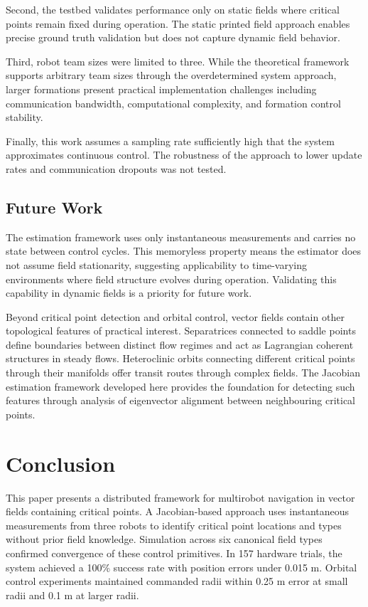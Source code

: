 \documentclass[lettersize,journal]{IEEEtran}
\begin{document}
Second, the testbed validates performance only on static fields where critical points remain fixed during operation. The static printed field approach enables precise ground truth validation but does not capture dynamic field behavior.

Third, robot team sizes were limited to three. While the theoretical framework supports arbitrary team sizes through the overdetermined system approach, larger formations present practical implementation challenges including communication bandwidth, computational complexity, and formation control stability.

Finally, this work assumes a sampling rate sufficiently high that the system approximates continuous control. The robustness of the approach to lower update rates and communication dropouts was not tested.

\subsection{Future Work}

The estimation framework uses only instantaneous measurements and carries no state between control cycles. This memoryless property means the estimator does not assume field stationarity, suggesting applicability to time-varying environments where field structure evolves during operation. Validating this capability in dynamic fields is a priority for future work.

Beyond critical point detection and orbital control, vector fields contain other topological features of practical interest. Separatrices connected to saddle points define boundaries between distinct flow regimes and act as Lagrangian coherent structures in steady flows. Heteroclinic orbits connecting different critical points through their manifolds offer transit routes through complex fields. The Jacobian estimation framework developed here provides the foundation for detecting such features through analysis of eigenvector alignment between neighbouring critical points.



\section{Conclusion}
\noindent

This paper presents a distributed framework for multirobot navigation in vector fields containing critical points. A Jacobian-based approach uses instantaneous measurements from three robots to identify critical point locations and types without prior field knowledge. Simulation across six canonical field types confirmed convergence of these control primitives. In 157 hardware trials, the system achieved a 100\% success rate with position errors under 0.015 m. Orbital control experiments maintained commanded radii within 0.25 m error at small radii and 0.1 m at larger radii.
\end{document}
